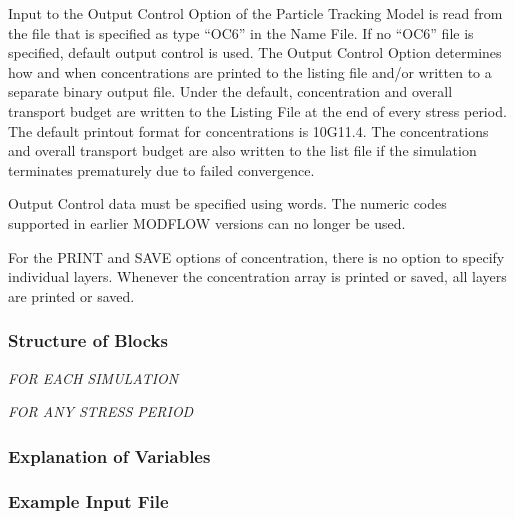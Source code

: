 Input to the Output Control Option of the Particle Tracking Model is read from the file that is specified as type ``OC6'' in the Name File. If no ``OC6'' file is specified, default output control is used. The Output Control Option determines how and when concentrations are printed to the listing file and/or written to a separate binary output file.  Under the default, concentration and overall transport budget are written to the Listing File at the end of every stress period. The default printout format for concentrations is 10G11.4.  The concentrations and overall transport budget are also written to the list file if the simulation terminates prematurely due to failed convergence.

Output Control data must be specified using words.  The numeric codes supported in earlier MODFLOW versions can no longer be used.

For the PRINT and SAVE options of concentration, there is no option to specify individual layers.  Whenever the concentration array is printed or saved, all layers are printed or saved.

\vspace{5mm}
\subsubsection{Structure of Blocks}
\vspace{5mm}

\noindent \textit{FOR EACH SIMULATION}

\vspace{5mm}
\noindent \textit{FOR ANY STRESS PERIOD}


\vspace{5mm}
\subsubsection{Explanation of Variables}
\begin{description}

\end{description}

\vspace{5mm}
\subsubsection{Example Input File}

